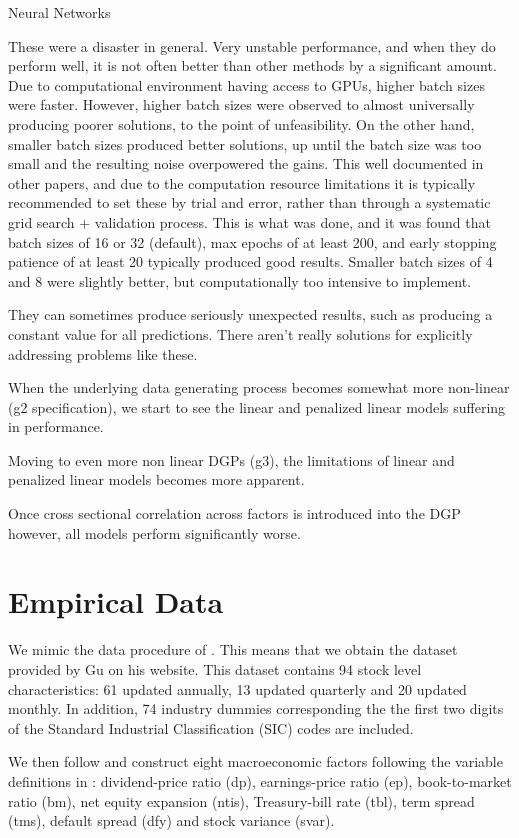\documentclass[a4paper, table]{article}
\begin{document}
Neural Networks

These were a disaster in general.
Very unstable performance, and when they do perform well, it is not often better than other methods by a significant amount. 
Due to computational environment having access to GPUs, higher batch sizes were faster. However, higher batch sizes were observed to almost universally producing poorer solutions, to the point of unfeasibility. On the other hand, smaller batch sizes produced better solutions, up until the batch size was too small and the resulting noise overpowered the gains. This well documented in other papers, and due to the computation resource limitations it is typically recommended to set these by trial and error, rather than through a systematic grid search + validation process. This is what was done, and it was found that batch sizes of 16 or 32 (default), max epochs of at least 200, and early stopping patience of at least 20 typically produced good results. Smaller batch sizes of 4 and 8 were slightly better, but computationally too intensive to implement.

They can sometimes produce seriously unexpected results, such as producing a constant value for all predictions. There aren't really solutions for explicitly addressing problems like these.

When the underlying data generating process becomes somewhat more non-linear (g2 specification), we start to see the linear and penalized linear models suffering in performance. 

Moving to even more non linear DGPs (g3), the limitations of linear and penalized linear models becomes more apparent.

Once cross sectional correlation across factors is introduced into the DGP however, all models perform significantly worse. 

\section{Empirical Data}

We mimic the data procedure of \cite{gu_empirical_2018}. This means that we obtain the dataset provided by Gu on his website. This dataset contains 94 stock level characteristics: 61 updated annually, 13 updated quarterly and 20 updated monthly. In addition, 74 industry dummies corresponding the the first two digits of the Standard Industrial Classification (SIC) codes are included. 

We then follow \cite{gu_empirical_2018} and construct eight macroeconomic factors following the variable definitions in \cite{welch_comprehensive_2008}: dividend-price ratio (dp), earnings-price ratio (ep), book-to-market ratio (bm), net equity expansion (ntis), Treasury-bill rate (tbl), term spread (tms), default spread (dfy) and stock variance (svar).
\end{document}
